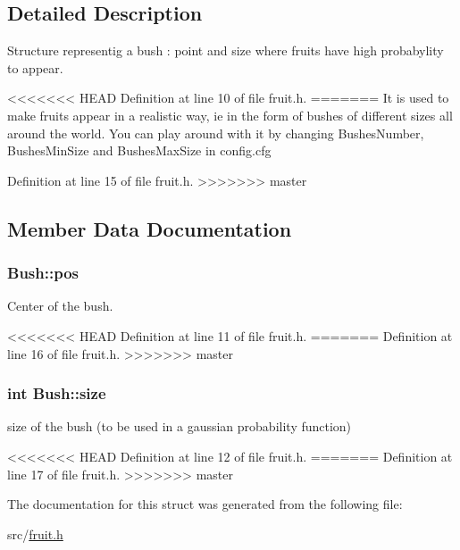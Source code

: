 \subsection{Detailed Description}
Structure representig a bush \-: point and size where fruits have high probabylity to appear. 

<<<<<<< HEAD
Definition at line 10 of file fruit.\-h.
=======
It is used to make fruits appear in a realistic way, ie in the form of bushes of different sizes all around the world. You can play around with it by changing Bushes\-Number, Bushes\-Min\-Size and Bushes\-Max\-Size in config.\-cfg 

Definition at line 15 of file fruit.\-h.
>>>>>>> master



\subsection{Member Data Documentation}
\hypertarget{struct_bush_ab3135be5ff260f0e223cb9c64f4aedc3}{
\subsubsection[{pos}]{ Bush\-::pos}}\label{struct_bush_ab3135be5ff260f0e223cb9c64f4aedc3}


Center of the bush. 



<<<<<<< HEAD
Definition at line 11 of file fruit.\-h.
=======
Definition at line 16 of file fruit.\-h.
>>>>>>> master

\hypertarget{struct_bush_a3b40c2cda3c709539246d302e74b8168}{
\subsubsection[{size}]{\setlength{\rightskip}{0pt plus 5cm}int Bush\-::size}}\label{struct_bush_a3b40c2cda3c709539246d302e74b8168}


size of the bush (to be used in a gaussian probability function) 



<<<<<<< HEAD
Definition at line 12 of file fruit.\-h.
=======
Definition at line 17 of file fruit.\-h.
>>>>>>> master



The documentation for this struct was generated from the following file\-:\begin{DoxyCompactItemize}
\item 
src/\hyperlink{fruit_8h}{fruit.\-h}\end{DoxyCompactItemize}

